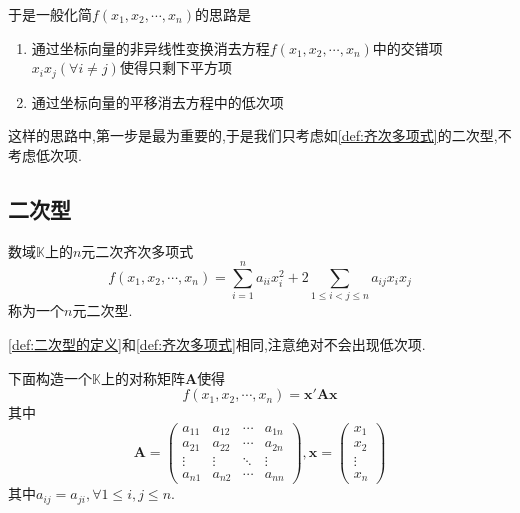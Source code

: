 于是一般化简$f\left(
    x_1,x_2,\cdots,x_n
\right)$的思路是\begin{enumerate}[label={\textup{(\arabic*)}}]
    \item 通过坐标向量的非异线性变换消去方程$f\left(
        x_1,x_2,\cdots,x_n
    \right)$中的交错项$x_ix_j\left(\forall i\neq j\right)$使得只剩下平方项
    \item 通过坐标向量的平移消去方程中的低次项
\end{enumerate}

这样的思路中,第一步是最为重要的,于是我们只考虑如\cref{def:齐次多项式}的二次型,不考虑低次项.
\subsection{二次型}
\begin{formal}
    \begin{definition}[二次型的定义]\label{def:二次型的定义}
        数域$\mathbb{K}$上的$n$元二次齐次多项式\[
        f\left(
            x_1,x_2,\cdots,x_n
        \right)=\sum_{i=1}^{n}a_{ii}x_i^2+2\sum_{1\leqslant i<j\leqslant n}a_{ij}x_ix_j
        \]称为一个$n$元二次型.
    \end{definition}
\end{formal}
\begin{red}
\begin{remark}
    \cref{def:二次型的定义}和\cref{def:齐次多项式}相同,注意绝对不会出现低次项.
\end{remark}
\end{red}
下面构造一个$\mathbb{K}$上的对称矩阵$\bm{A}$使得\[
f\left(
    x_1,x_2,\cdots,x_n
\right)=\bm{x}'\bm{Ax}
\]其中\[
\bm{A}=\begin{pmatrix}
       a_{11}&a_{12}&\cdots&a_{1n}\\
        a_{21}&a_{22}&\cdots&a_{2n}\\
        \vdots&\vdots&\ddots&\vdots\\
        a_{n1}&a_{n2}&\cdots&a_{nn}  
\end{pmatrix},\bm{x}=\begin{pmatrix}
    x_1\\x_2\\\vdots\\x_n
\end{pmatrix}
\]其中$a_{ij}=a_{ji},\forall 1\leqslant i,j\leqslant n$. 

